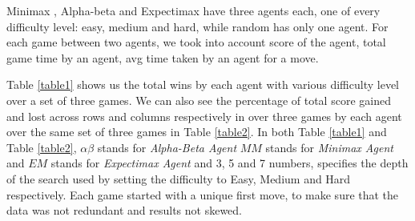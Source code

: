 \documentclass{svproc}
\begin{document}
Minimax , Alpha-beta and Expectimax have three agents each, one of every difficulty level: easy, medium and hard, while random has only one agent. For each game between two agents, we took into account score of the agent, total game time by an agent, avg time taken by an agent for a move.

Table \ref{table1} shows us the total wins by each agent with various difficulty level over a set of three games. We can also see the percentage of total score gained and lost across rows and columns respectively in over three games by each agent over the same set of three games in Table \ref{table2}. In both Table \ref{table1} and Table \ref{table2}, $\alpha\beta$ stands for \emph{Alpha-Beta Agent}  $MM$ stands for \emph{Minimax Agent} and $EM$ stands for \emph{Expectimax Agent} and 3, 5 and 7 numbers, specifies the depth of the search used by setting the difficulty to Easy, Medium and Hard respectively. Each game started with a unique first move, to make sure that the data was not redundant and results not skewed.
\end{document}
